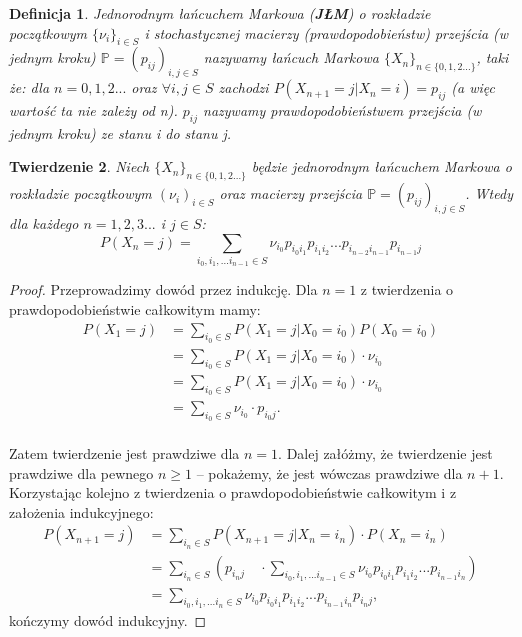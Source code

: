 \documentclass[a4paper]{article}
\theoremstyle{defn}
\newtheorem{defn}{Definicja}[subsection]
\theoremstyle{theorem}
\newtheorem{theorem}[defn]{Twierdzenie}
\theoremstyle{lemma}
\theoremstyle{cor}
\theoremstyle{fact}
\begin{document}
\begin{defn}\label{defn2.1.9}
\textit{Jednorodnym łańcuchem Markowa} (\textbf{JŁM}) o rozkładzie początkowym $\{\nu_i\}_{i \in S}$ i stochastycznej \textit{macierzy (prawdopodobieństw) przejścia (w jednym kroku)} $\mathbb{P} = (p_{ij})_{i, j \in S}$ nazywamy łańcuch Markowa $\{X_n\}_{n \in \{0,1,2...\}}$, taki że: dla $n = 0,1,2...$ oraz $\forall i,j \in S$ zachodzi $P(X_{n+1} = j|X_n = i) = p_{ij}$ (a więc wartość ta nie zależy od \textit{n}). $p_{ij}$ nazywamy \textit{prawdopodobieństwem przejścia (w jednym kroku)} ze stanu \textit{i} do stanu \textit{j}.
\end{defn}
\begin{theorem}\label{theorem2.1.10}
Niech $\{X_n\}_{n \in \{0,1,2...\}}$ będzie jednorodnym łańcuchem Markowa o rozkładzie początkowym $(\nu_i)_{i \in S}$ oraz macierzy przejścia $\mathbb{P} = (p_{ij})_{i,j \in S}$. Wtedy dla każdego $n = 1,2,3...$ i $j \in S$:\\
$$P(X_n = j) = \sum\limits_{i_0, i_1,... i_{n-1} \in S} \nu_{i_0} p_{i_{0}i_{1}} p_{i_{1}i_{2}} ... p_{i_{n-2}i_{n-1}}p_{i_{n-1}j}$$
\end{theorem}
\begin{proof}Przeprowadzimy dowód przez indukcję. Dla $n=1$ z twierdzenia o prawdopodobieństwie całkowitym mamy:
\begin{align*}
P(X_1 = j) &= \sum\limits_{i_0 \in S} P(X_1 = j | X_0 = i_0)P(X_0 = i_0)\\
&= \sum\limits_{i_0 \in S} P(X_1 = j | X_0 = i_0) \cdot \nu_{i_0} \\
&= \sum\limits_{i_0 \in S} P(X_1 = j | X_0 = i_0) \cdot \nu_{i_0} \\
&= \sum\limits_{i_0 \in S}  \nu_{i_0} \cdot p_{i_0j}.
\end{align*}
\\Zatem twierdzenie jest prawdziwe dla $n=1$. Dalej załóżmy, że twierdzenie jest prawdziwe dla pewnego $n \geq 1$ – pokażemy, że jest wówczas prawdziwe dla $n+1$. Korzystając kolejno z twierdzenia o prawdopodobieństwie całkowitym i z założenia indukcyjnego:
\begin{align*}P(X_{n+1} = j) &= \sum\limits_{i_{n} \in S} P(X_{n+1} = j|X_n = i_n)\cdot P(X_n = i_n) \\
&= \sum\limits_{i_n \in S}\left(p_{i_nj} \quad \cdot \sum\limits_{i_0, i_1, ... i_{n-1} \in S} \nu_{i_0} p_{i_{0}i_{1}} p_{i_{1}i_{2}} ... p_{i_{n-1}i_n}\right) \\
&= \sum\limits_{i_0, i_1,... i_n \in S} \nu_{i_0} p_{i_{0}i_{1}} p_{i_{1}i_{2}} ... p_{i_{n-1}i_n}p_{i_{n}j},
\end{align*}
kończymy dowód indukcyjny.
\end{proof}
\end{document}
